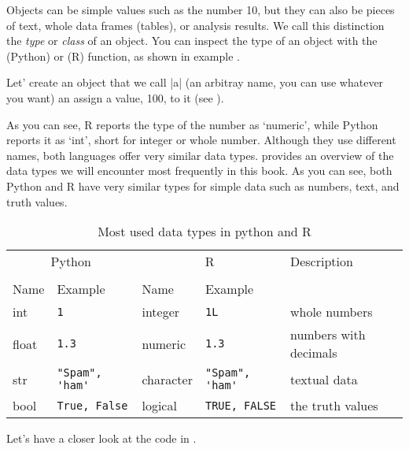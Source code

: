 Objects can be simple values such as the number 10, but they can also
be pieces of text, whole data frames (tables), or analysis results.
We call this distinction the \emph{type} or \emph{class} of an
object.  You can inspect the type of an object with the 
(Python) or  (R) function, as shown in example . 

Let' create an object that we call |a| (an arbitray name, you can use
whatever you want) an assign a value, 100, to it (see ).


As you can see, R reports the type of the number as `numeric', while Python reports it
as `int', short for integer or whole number.  Although they use
different names, both languages offer very similar data types.
 provides an overview of the data types we will
encounter most frequently in this book.  As you can see,
both Python and R have very similar types for simple data such as
numbers, text, and truth values.

\newcommand{\fndouble}{In R, double and numeric can generally be used
  interchangably (there is a subtle difference, but that is not
  relevant here).}

\begin{table}
  \caption{\label{tab:types}Most used data types in python and R}{
  \begin{tabularx}{\textwidth}{lllll}
    \toprule
    \multicolumn{2}{c}{Python} & \multicolumn{2}{c}{R}& Description \\
    \cmidrule(lr){1-2}    \cmidrule(lr){3-4}\\
    Name & Example & Name & Example \\
    \midrule
    int   & \verb+1+             & integer   & \verb+1L+             & whole numbers \\
    float & \verb+1.3+           & numeric   & \verb+1.3+           & numbers with decimals \\
    str   & \verb+"Spam", 'ham'+ & character & \verb+"Spam", 'ham'+ & textual data  \\ 
    bool  & \verb+True, False+   & logical   & \verb+TRUE, FALSE+   & the truth values \\
    \bottomrule
  \end{tabularx}}{}
\end{table}
    


Let's have a closer look at the code in .

